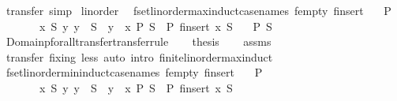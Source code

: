 \begin{isabellebody}
\ transfer\ simp%
\endisatagproof
{\isafoldproof}%
%
\isadelimproof
\isanewline
%
\endisadelimproof
\isanewline
{}\isamarkupfalse%
\ linorder\ \isanewline
\isanewline
{}\isamarkupfalse%
\ fset{\isacharunderscore}linorder{\isacharunderscore}max{\isacharunderscore}induct{\isacharbrackleft}case{\isacharunderscore}names\ fempty\ finsert{\isacharbrackright}{\isacharcolon}\isanewline
\ \ \ {\isachardoublequoteopen}P\ {\isacharbraceleft}{\isacharbar}{\isacharbar}{\isacharbraceright}{\isachardoublequoteclose}\isanewline
\ \ \ \ \ \ \ {\isachardoublequoteopen}{\isasymAnd}x\ S{\isachardot}\ {\isasymlbrakk}{\isasymforall}y{\isachardot}\ y\ {\isacharbar}{\isasymin}{\isacharbar}\ S\ {\isasymlongrightarrow}\ y\ {\isacharless}\ x{\isacharsemicolon}\ P\ S{\isasymrbrakk}\ {\isasymLongrightarrow}\ P\ {\isacharparenleft}finsert\ x\ S{\isacharparenright}{\isachardoublequoteclose}\isanewline
\ \ \ {\isachardoublequoteopen}P\ S{\isachardoublequoteclose}\isanewline
%
\isadelimproof
%
\endisadelimproof
%
\isatagproof
{}\isamarkupfalse%
\ {\isacharminus}\isanewline
\ \ \isanewline
\ \ \isamarkupfalse%
\ Domainp{\isacharunderscore}forall{\isacharunderscore}transfer{\isacharbrackleft}transfer{\isacharunderscore}rule{\isacharbrackright}\isanewline
\ \ \isamarkupfalse%
\ {\isacharquery}thesis\isanewline
\ \ \isamarkupfalse%
\ assms\ \isamarkupfalse%
\ {\isacharparenleft}transfer\ fixing{\isacharcolon}\ less{\isacharparenright}\ {\isacharparenleft}auto\ intro{\isacharcolon}\ finite{\isacharunderscore}linorder{\isacharunderscore}max{\isacharunderscore}induct{\isacharparenright}\isanewline
{}\isamarkupfalse%
%
\endisatagproof
{\isafoldproof}%
%
\isadelimproof
\isanewline
%
\endisadelimproof
\isanewline
{}\isamarkupfalse%
\ fset{\isacharunderscore}linorder{\isacharunderscore}min{\isacharunderscore}induct{\isacharbrackleft}case{\isacharunderscore}names\ fempty\ finsert{\isacharbrackright}{\isacharcolon}\isanewline
\ \ \ {\isachardoublequoteopen}P\ {\isacharbraceleft}{\isacharbar}{\isacharbar}{\isacharbraceright}{\isachardoublequoteclose}\isanewline
\ \ \ \ \ \ \ {\isachardoublequoteopen}{\isasymAnd}x\ S{\isachardot}\ {\isasymlbrakk}{\isasymforall}y{\isachardot}\ y\ {\isacharbar}{\isasymin}{\isacharbar}\ S\ {\isasymlongrightarrow}\ y\ {\isachargreater}\ x{\isacharsemicolon}\ P\ S{\isasymrbrakk}\ {\isasymLongrightarrow}\ P\ {\isacharparenleft}finsert\ x\ S{\isacharparenright}{\isachardoublequoteclose}\isanewline

\end{isabellebody}
